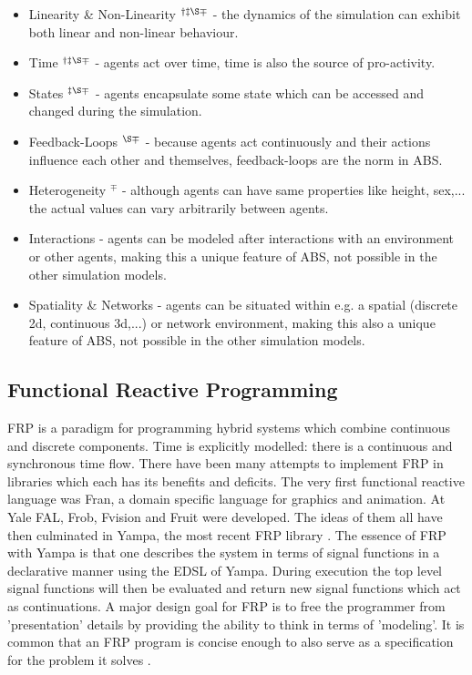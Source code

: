 \begin{itemize}
	\item Linearity \& Non-Linearity $^{\dag \ddag \S \mp}$ - the dynamics of the simulation can exhibit both linear and non-linear behaviour. 
	\item Time $^{\dag \ddag \S \mp}$ - agents act over time, time is also the source of pro-activity.
	\item States $^{\ddag \S \mp}$ - agents encapsulate some state which can be accessed and changed during the simulation.
	\item Feedback-Loops $^{\S \mp}$ - because agents act continuously and their actions influence each other and themselves, feedback-loops are the norm in ABS. 
	\item Heterogeneity $^{\mp}$ - although agents can have same properties like height, sex,... the actual values can vary arbitrarily between agents.
	\item Interactions - agents can be modeled after interactions with an environment or other agents, making this a unique feature of ABS, not possible in the other simulation models.
	\item Spatiality \& Networks - agents can be situated within e.g. a spatial (discrete 2d, continuous 3d,...) or network environment, making this also a unique feature of ABS, not possible in the other simulation models.
\end{itemize}

\subsection{Functional Reactive Programming}
FRP is a paradigm for programming hybrid systems which combine continuous and discrete components. Time is explicitly modelled: there is a continuous and synchronous time flow. There have been many attempts to implement FRP in libraries which each has its benefits and deficits. The very first functional reactive language was Fran, a domain specific language for graphics and animation. At Yale FAL, Frob, Fvision and Fruit were developed. The ideas of them all have then culminated in Yampa, the most recent FRP library \cite{nilsson_functional_2002}. The essence of FRP with Yampa is that one describes the system in terms of signal functions in a declarative manner using the EDSL of Yampa. During execution the top level signal functions will then be evaluated and return new signal functions which act as continuations. A major design goal for FRP is to free the programmer from 'presentation' details by providing the ability to think in terms of 'modeling'. It is common that an FRP program is concise enough to also serve as a specification for the problem it solves \cite{wan_functional_2000}.


